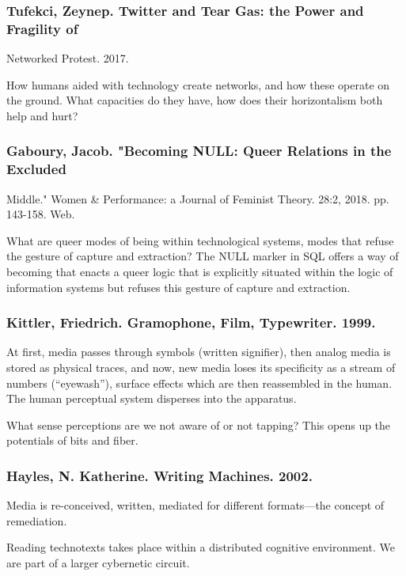 \documentclass[11pt]{article}
\begin{document}
\subsubsection{Tufekci, Zeynep. Twitter and Tear Gas: the Power and Fragility of}
\label{sec:orgf620e57}
Networked Protest. 2017.

How humans aided with technology create networks, and how these
operate on the ground. What capacities do they have, how does their
horizontalism both help and hurt?

\subsubsection{Gaboury, Jacob. "Becoming NULL: Queer Relations in the Excluded}
\label{sec:org9541814}
Middle." Women \& Performance: a Journal of Feminist
Theory. 28:2, 2018. pp. 143-158. Web.

What are queer modes of being within technological systems, modes that
refuse the gesture of capture and extraction? The NULL marker in SQL
offers a way of becoming that enacts a queer logic that is explicitly
situated within the logic of information systems but refuses this
gesture of capture and extraction.

\subsubsection{Kittler, Friedrich. Gramophone, Film, Typewriter. 1999.}
\label{sec:orgc48afe7}

At first, media passes through symbols (written signifier), then
analog media is stored as physical traces, and now, new media loses
its specificity as a stream of numbers (“eyewash”), surface effects
which are then reassembled in the human. The human perceptual system
disperses into the apparatus.

What sense perceptions are we not aware of or not tapping? This opens
up the potentials of bits and fiber.

\subsubsection{Hayles, N. Katherine. Writing Machines. 2002.}
\label{sec:org7f8ca53}
Media is re-conceived, written, mediated for different formats---the
concept of remediation.

Reading technotexts takes place within a distributed cognitive
environment. We are part of a larger cybernetic circuit.
\end{document}
